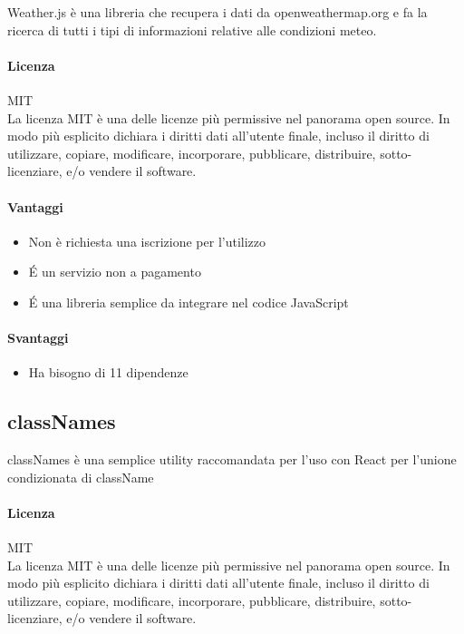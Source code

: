 Weather.js è una libreria che recupera i dati da openweathermap.org e
fa la ricerca di tutti i tipi di informazioni relative alle condizioni
meteo. 

\paragraph{Licenza} MIT \\
La licenza MIT è una delle licenze più permissive nel panorama open
source. In modo più esplicito dichiara i diritti dati all'utente
finale, incluso il diritto di utilizzare, copiare, modificare,
incorporare, pubblicare, distribuire, sotto-licenziare, e/o vendere il
software. \\

\paragraph{Vantaggi}
\begin{itemize}
	\item Non è richiesta una iscrizione per l'utilizzo
	\item \'E un servizio non a pagamento
	\item \'E una libreria semplice da integrare nel codice JavaScript
\end{itemize}

\paragraph{Svantaggi} 
\begin{itemize}
	\item Ha bisogno di 11 dipendenze 
\end{itemize}


\subsection{classNames}

classNames è una semplice utility raccomandata per l'uso con React per l'unione condizionata di className

\paragraph{Licenza} MIT \\
La licenza MIT è una delle licenze più permissive nel panorama open
source. In modo più esplicito dichiara i diritti dati all'utente
finale, incluso il diritto di utilizzare, copiare, modificare,
incorporare, pubblicare, distribuire, sotto-licenziare, e/o vendere il
software. 
\\

